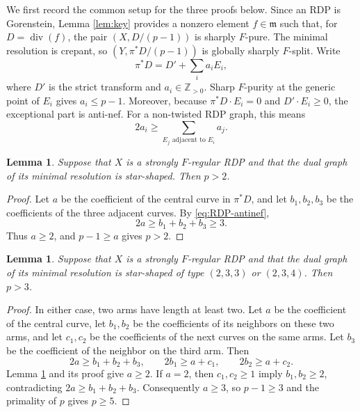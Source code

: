 \documentclass[12pt]{amsart}
\def\ge{\geqslant}
\def\le{\leqslant}
\def\m{{\mathfrak m}}
\theoremstyle{plain}
\newtheorem{lem}[thm]{Lemma}
\theoremstyle{definition}
\theoremstyle{remark}
\newtheorem{defn and notation}[thm]{Definition and Notation}
\theoremstyle{plain}
\numberwithin{equation}{thm}
\begin{document}
We first record the common setup for the three proofs below.
Since an RDP is Gorenstein, Lemma \ref{lem:key} provides a nonzero element $f\in\m$ such that, for $D=\operatorname{div}(f)$, the pair $(X,D/(p-1))$ is sharply $F$-pure.
The minimal resolution is crepant, so $(Y,\pi^*D/(p-1))$ is globally sharply $F$-split.
Write
\[
\pi^*D=D'+\sum_i a_iE_i,
\]
where $D'$ is the strict transform and $a_i\in\mathbb Z_{>0}$.
Sharp $F$-purity at the generic point of $E_i$ gives $a_i\le p-1$.
Moreover, because $\pi^*D\cdot E_i=0$ and $D'\cdot E_i\ge0$, the exceptional part is anti-nef.
For a non-twisted RDP graph, this means
\begin{equation}\label{eq:RDP-antinef}
2a_i\ge\sum_{E_j\text{ adjacent to }E_i}a_j.
\end{equation}

\begin{lem}\label{lem:RDP1}
Suppose that $X$ is a strongly $F$-regular RDP and that the dual graph of its minimal resolution is star-shaped.
Then $p>2$.
\end{lem}
\begin{proof}
Let $a$ be the coefficient of the central curve in $\pi^*D$, and let $b_1,b_2,b_3$ be the coefficients of the three adjacent curves.
By \eqref{eq:RDP-antinef},
\[
2a\ge b_1+b_2+b_3\ge3.
\]
Thus $a\ge2$, and $p-1\ge a$ gives $p>2$.
\end{proof}

\begin{lem}\label{lem:RDP2}
Suppose that $X$ is a strongly $F$-regular RDP and that the dual graph of its minimal resolution is star-shaped of type $(2,3,3)$ or $(2,3,4)$.
Then $p>3$.
\end{lem}
\begin{proof}
In either case, 
two arms have length at least two.
Let $a$ be the coefficient of the central curve, let $b_1,b_2$ be the coefficients of its neighbors on these two arms, and let $c_1,c_2$ be the coefficients of the next curves on the same arms.
Let $b_3$ be the coefficient of the neighbor on the third arm.
Then
\[
2a\ge b_1+b_2+b_3,\qquad
2b_1\ge a+c_1,\qquad
2b_2\ge a+c_2.
\]
Lemma \ref{lem:RDP1} and its proof give $a\ge2$.
If $a=2$, then $c_1,c_2\ge1$ imply $b_1,b_2\ge2$, contradicting $2a\ge b_1+b_2+b_3$.
Consequently $a\ge3$, so $p-1\ge3$ and the primality of $p$ gives $p\ge5$.
\end{proof}
\end{document}
